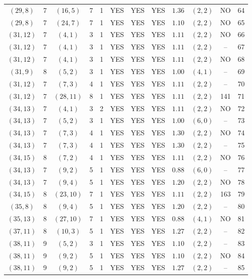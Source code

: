 \begin{longtable}{|c|c|c|c|c|c|c|c|c|c|c|c|}
$(29,8)$ & 7 & $(16,5)$ & 7 & 1 & YES & YES & YES & $1.36$ & $(2,2)$ & NO & 64\\
$(29,8)$ & 7 & $(24,7)$ & 7 & 1 & YES & YES & YES & $1.10$ & $(2,2)$ & NO & 65\\
$(31,12)$ & 7 & $(4,1)$ & 3 & 1 & YES & YES & YES & $1.11$ & $(2,2)$ & NO & 66\\
$(31,12)$ & 7 & $(4,1)$ & 3 & 1 & YES & YES & YES & $1.11$ & $(2,2)$ & -- & 67\\
$(31,12)$ & 7 & $(4,1)$ & 3 & 1 & YES & YES & YES & $1.11$ & $(2,2)$ & NO & 68\\
$(31,9)$ & 8 & $(5,2)$ & 3 & 1 & YES & YES & YES & $1.00$ & $(4,1)$ & -- & 69\\
$(31,12)$ & 7 & $(7,3)$ & 4 & 1 & YES & YES & YES & $1.11$ & $(2,2)$ & -- & 70\\
$(31,12)$ & 7 & $(28,11)$ & 8 & 1 & YES & YES & YES & $1.11$ & $(2,2)$ & 141 & 71\\
$(34,13)$ & 7 & $(4,1)$ & 3 & 2 & YES & YES & YES & $1.11$ & $(2,2)$ & NO & 72\\
$(34,13)$ & 7 & $(5,2)$ & 3 & 1 & YES & YES & YES & $1.00$ & $(6,0)$ & -- & 73\\
$(34,13)$ & 7 & $(7,3)$ & 4 & 1 & YES & YES & YES & $1.30$ & $(2,2)$ & NO & 74\\
$(34,13)$ & 7 & $(7,3)$ & 4 & 1 & YES & YES & YES & $1.30$ & $(2,2)$ & -- & 75\\
$(34,15)$ & 8 & $(7,2)$ & 4 & 1 & YES & YES & YES & $1.11$ & $(2,2)$ & NO & 76\\
$(34,13)$ & 7 & $(9,2)$ & 5 & 1 & YES & YES & YES & $0.88$ & $(6,0)$ & -- & 77\\
$(34,13)$ & 7 & $(9,4)$ & 5 & 1 & YES & YES & YES & $1.20$ & $(2,2)$ & NO & 78\\
$(34,15)$ & 8 & $(23,10)$ & 7 & 1 & YES & YES & YES & $1.11$ & $(2,2)$ & 163 & 79\\
$(35,8)$ & 8 & $(9,4)$ & 5 & 1 & YES & YES & YES & $1.20$ & $(2,2)$ & -- & 80\\
$(35,13)$ & 8 & $(27,10)$ & 7 & 1 & YES & YES & YES & $0.88$ & $(4,1)$ & NO & 81\\
$(37,11)$ & 8 & $(10,3)$ & 5 & 1 & YES & YES & YES & $1.27$ & $(2,2)$ & -- & 82\\
$(38,11)$ & 9 & $(5,2)$ & 3 & 1 & YES & YES & YES & $1.10$ & $(2,2)$ & -- & 83\\
$(38,11)$ & 9 & $(9,2)$ & 5 & 1 & YES & YES & YES & $1.10$ & $(2,2)$ & NO & 84\\
$(38,11)$ & 9 & $(9,2)$ & 5 & 1 & YES & YES & YES & $1.27$ & $(2,2)$ & -- & 85\\

\end{longtable}
